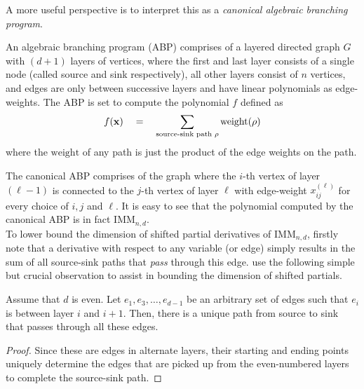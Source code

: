 \documentclass[12pt]{report}
\begin{document}
A more useful perspective is to interpret this as a \emph{canonical algebraic branching program}. 

\begin{definition}
An algebraic branching program (ABP) comprises of a layered directed graph $G$ with $(d+1)$ layers of vertices, where the first and last layer consists of a single node (called source and sink respectively), all other layers consist of $n$ vertices, and edges are only between successive layers and have linear polynomials as edge-weights. The ABP is set to compute the polynomial $f$ defined as
$$
f(\mathbf{x}) \quad = \quad \sum_{\text{source-sink path $\rho$}} \mathrm{weight}(\rho)
$$
where the $\mathrm{weight}$ of any path is just the product of the edge weights on the path. 
\end{definition}

The canonical ABP comprises of the graph where the $i$-th vertex of layer $(\ell-1)$ is connected to the $j$-th vertex of layer $\ell$ with edge-weight $x_{ij}^{(\ell)}$ for every choice of $i,j$ and $\ell$. It is easy to see that the polynomial computed by the canonical ABP is in fact $\mathrm{IMM}_{n,d}$. \\

To lower bound the dimension of shifted partial derivatives of $\mathrm{IMM}_{n,d}$, firstly note that a derivative with respect to any variable (or edge) simply results in the sum of all source-sink paths that \emph{pass} through this edge. \cite{FLMS13} use the following simple but crucial observation to assist in bounding the dimension of shifted partials. 

\begin{observation}\label{obs:odd-layer-unique-path}
Assume that $d$ is even. Let $e_1,e_3,\dots, e_{d-1}$ be an arbitrary set of edges such that $e_i$ is between layer $i$ and $i+1$. Then, there is a unique path from source to sink that passes through all these edges. 
\end{observation}
\begin{proof}
Since these are edges in alternate layers, their starting and ending points uniquely determine the edges that are picked up from the even-numbered layers to complete the source-sink path.
\end{proof}
\end{document}

